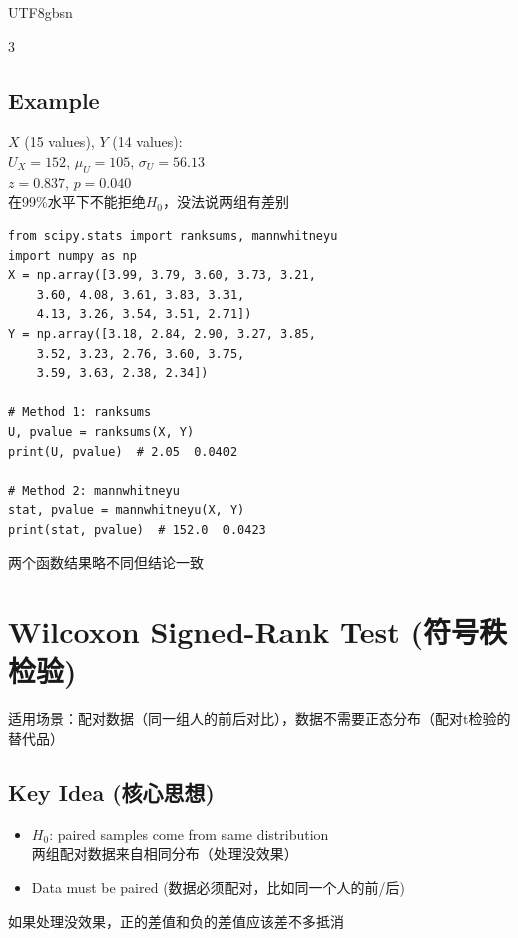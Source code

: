 \documentclass[10pt,landscape,a4paper]{article}
\newcommand{\zhint}[1]{{\scriptsize\color{gray!70!black}#1}}
\begin{document}
\begin{CJK}{UTF8}{gbsn}
\begin{multicols}{3}
\subsection{Example}
$X$ (15 values), $Y$ (14 values):\\
$U_X = 152$, $\mu_U = 105$, $\sigma_U = 56.13$\\
$z = 0.837$, $p = 0.040$\\
\zhint{在99\%水平下不能拒绝$H_0$，没法说两组有差别}

\begin{lstlisting}
from scipy.stats import ranksums, mannwhitneyu
import numpy as np
X = np.array([3.99, 3.79, 3.60, 3.73, 3.21,
    3.60, 4.08, 3.61, 3.83, 3.31,
    4.13, 3.26, 3.54, 3.51, 2.71])
Y = np.array([3.18, 2.84, 2.90, 3.27, 3.85,
    3.52, 3.23, 2.76, 3.60, 3.75,
    3.59, 3.63, 2.38, 2.34])

# Method 1: ranksums
U, pvalue = ranksums(X, Y)
print(U, pvalue)  # 2.05  0.0402

# Method 2: mannwhitneyu
stat, pvalue = mannwhitneyu(X, Y)
print(stat, pvalue)  # 152.0  0.0423
\end{lstlisting}
\zhint{两个函数结果略不同但结论一致}

\section{Wilcoxon Signed-Rank Test \zhint{(符号秩检验)}}

\zhint{适用场景：配对数据（同一组人的前后对比），数据不需要正态分布（配对t检验的替代品）}

\subsection{Key Idea \zhint{(核心思想)}}
\begin{itemize}[leftmargin=*, nosep, itemsep=0pt]
    \item $H_0$: paired samples come from same distribution\\
    \zhint{两组配对数据来自相同分布（处理没效果）}
    \item Data must be paired \zhint{(数据必须配对，比如同一个人的前/后)}
\end{itemize}
\zhint{如果处理没效果，正的差值和负的差值应该差不多抵消}


\end{multicols}
\end{CJK}
\end{document}
